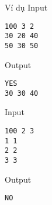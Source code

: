 Ví dụ
Input
\begin{verbatim}
100 3 2
30 20 40
50 30 50\end{verbatim}

Output
\begin{verbatim}
YES
30 30 40\end{verbatim}

Input
\begin{verbatim}
100 2 3
1 1
2 2
3 3\end{verbatim}

Output
\begin{verbatim}
NO\end{verbatim}